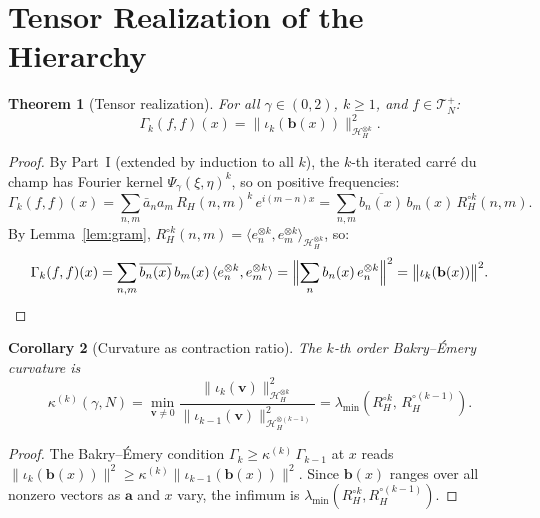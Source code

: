 \documentclass[11pt,a4paper]{article}
\theoremstyle{plain}
\newtheorem{theorem}{Theorem}[section]
\newtheorem{corollary}[theorem]{Corollary}
\theoremstyle{definition}
\theoremstyle{remark}
\newcommand{\HH}{\mathcal{H}_H}
\begin{document}
\section{Tensor Realization of the Hierarchy}
\label{sec:tensor}

\begin{theorem}[Tensor realization]\label{thm:tensor}
For all $\gamma \in (0,2)$, $k \geq 1$, and
$f \in \mathcal{T}_N^+$:
\begin{equation}\label{eq:tensor}
  \Gamma_k(f,f)(x)
  = \bigl\|\iota_k(\mathbf{b}(x))\bigr\|^2_{\HH^{\otimes k}}.
\end{equation}
\end{theorem}

\begin{proof}
By Part~I (extended by induction to all $k$), the
$k$-th iterated carr\'e du champ has Fourier kernel
$\Psi_\gamma(\xi,\eta)^k$, so on positive frequencies:
\[
  \Gamma_k(f,f)(x)
  = \sum_{n,m} \bar{a}_n a_m\,R_H(n,m)^k\,e^{i(m-n)x}
  = \sum_{n,m} \overline{b_n(x)}\,b_m(x)\,
    R_H^{\circ k}(n,m).
\]
By Lemma~\ref{lem:gram},
$R_H^{\circ k}(n,m) = \langle e_n^{\otimes k},
e_m^{\otimes k} \rangle_{\HH^{\otimes k}}$, so:
\[
  \Gamma_k(f,f)(x)
  = \sum_{n,m} \overline{b_n(x)}\,b_m(x)\,
    \langle e_n^{\otimes k}, e_m^{\otimes k} \rangle
  = \Bigl\|\sum_n b_n(x)\,e_n^{\otimes k}\Bigr\|^2
  = \bigl\|\iota_k(\mathbf{b}(x))\bigr\|^2.
  \qedhere
\]
\end{proof}

\begin{corollary}[Curvature as contraction ratio]
\label{cor:contraction}
The $k$-th order Bakry--\'Emery curvature is
\begin{equation}\label{eq:kappak}
  \kappa^{(k)}(\gamma,N)
  = \min_{\mathbf{v} \neq 0}
    \frac{\|\iota_k(\mathbf{v})\|^2_{\HH^{\otimes k}}}
         {\|\iota_{k-1}(\mathbf{v})\|^2_{\HH^{\otimes(k-1)}}}
  = \lambda_{\min}(R_H^{\circ k},\, R_H^{\circ(k-1)}).
\end{equation}
\end{corollary}

\begin{proof}
The Bakry--\'Emery condition
$\Gamma_k \geq \kappa^{(k)}\,\Gamma_{k-1}$
at $x$ reads
$\|\iota_k(\mathbf{b}(x))\|^2
\geq \kappa^{(k)}\|\iota_{k-1}(\mathbf{b}(x))\|^2$.
Since $\mathbf{b}(x)$ ranges over all nonzero vectors
as $\mathbf{a}$ and $x$ vary, the infimum is
$\lambda_{\min}(R_H^{\circ k}, R_H^{\circ(k-1)})$.
\end{proof}
\end{document}
